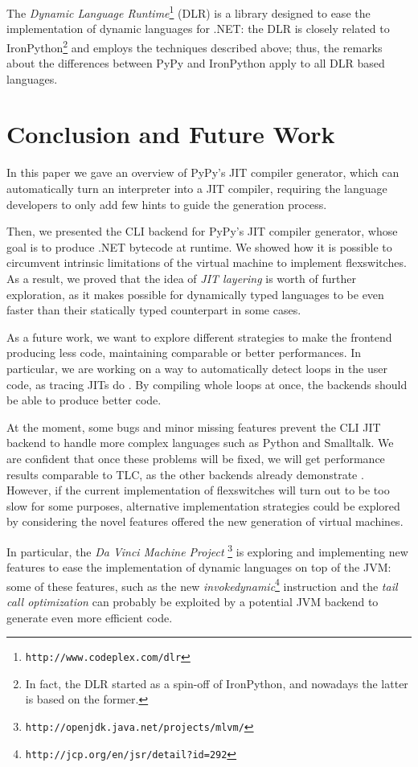 The \emph{Dynamic Language Runtime}\footnote{\texttt{http://www.codeplex.com/dlr}}
(DLR) is a library designed to ease the implementation of dynamic languages
for .NET: the DLR is closely related to IronPython\footnote{In fact, the DLR
  started as a spin-off of IronPython, and nowadays the latter is based on the
  former.} and employs the techniques described above; thus, the remarks
about the differences between PyPy and IronPython apply to all DLR based
languages.

\section{Conclusion and Future Work}

In this paper we gave an overview of PyPy's JIT compiler generator,
which can automatically turn an interpreter into a JIT
compiler, requiring the language developers to only add few hints to
guide the generation process.

Then, we presented the CLI backend for PyPy's JIT compiler generator, whose
goal is to produce .NET bytecode at runtime.  We showed how it is possible to
circumvent intrinsic limitations of the virtual machine to implement
flexswitches.  As a result, we proved that the idea of \emph{JIT layering} is
worth of further exploration, as it makes possible for dynamically typed
languages to be even faster than their statically typed counterpart in some
cases.

As a future work, we want to explore different strategies to make the frontend
producing less code, maintaining comparable or better performances.  In
particular, we are working on a way to automatically detect loops in the user
code, as tracing JITs do \cite{gal_hotpathvm_2006}.  By compiling whole
loops at once, the backends should be able to produce better code.

At the moment, some bugs and minor missing features prevent the CLI JIT
backend to handle more complex languages such as Python and Smalltalk.  We are
confident that once these problems will be fixed, we will get performance
results comparable to TLC, as the other backends already demonstrate
\cite{PyPyJIT}.  However, if the current implementation of flexswitches will
turn out to be too slow for some purposes, alternative
implementation strategies could be explored by considering the novel features 
offered the new generation of virtual machines.

In particular, the \emph{Da Vinci Machine
  Project} \footnote{\texttt{http://openjdk.java.net/projects/mlvm/}} is exploring and
implementing new features to ease the implementation of dynamic languages on
top of the JVM: some of these features, such as the new
\emph{invokedynamic}\footnote{\texttt{http://jcp.org/en/jsr/detail?id=292}} instruction and the \emph{tail call
  optimization} can probably be exploited by a potential JVM backend to
generate even more efficient code.
